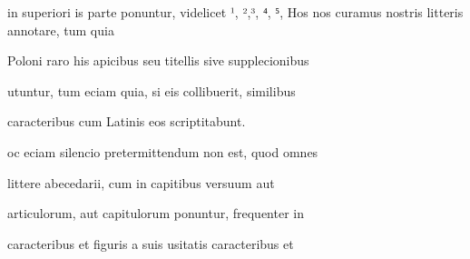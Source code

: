 





in superiori is parte ponuntur, videlicet ¹, ²,³, ⁴, ⁵,  Hos
nos curamus nostris litteris annotare, tum quia

Poloni raro his apicibus seu titellis sive supplecionibus

utuntur, tum eciam quia, si eis collibuerit, similibus

caracteribus cum Latinis eos scriptitabunt.

\indentP {}oc eciam silencio pretermittendum non est, quod omnes

littere abecedarii, cum in capitibus versuum aut

articulorum, aut capitulorum ponuntur, frequenter in

caracteribus et figuris a suis usitatis caracteribus et

